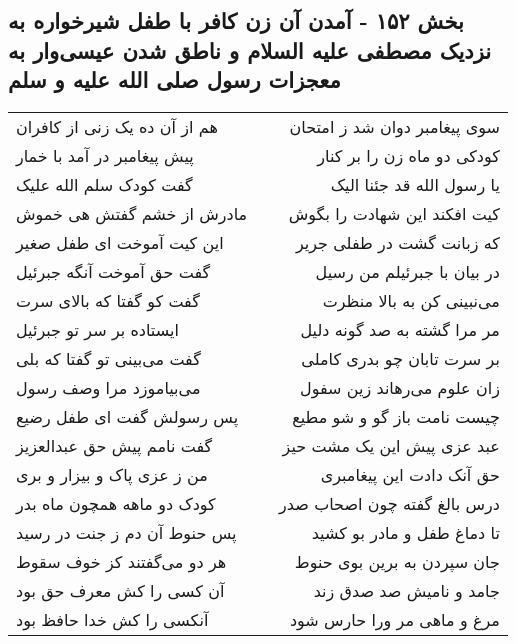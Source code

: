 \begin{center}
\section*{بخش ۱۵۲ - آمدن آن زن کافر با طفل شیرخواره به نزدیک مصطفی علیه السلام و ناطق شدن عیسی‌وار به معجزات رسول صلی الله علیه و سلم}
\label{sec:sh152}
\begin{longtable}{l p{0.5cm} r}
هم از آن ده یک زنی از کافران
&&
سوی پیغامبر دوان شد ز امتحان
\\
پیش پیغامبر در آمد با خمار
&&
کودکی دو ماه زن را بر کنار
\\
گفت کودک سلم الله علیک
&&
یا رسول الله قد جئنا الیک
\\
مادرش از خشم گفتش هی خموش
&&
کیت افکند این شهادت را بگوش
\\
این کیت آموخت ای طفل صغیر
&&
که زبانت گشت در طفلی جریر
\\
گفت حق آموخت آنگه جبرئیل
&&
در بیان با جبرئیلم من رسیل
\\
گفت کو گفتا که بالای سرت
&&
می‌نبینی کن به بالا منظرت
\\
ایستاده بر سر تو جبرئیل
&&
مر مرا گشته به صد گونه دلیل
\\
گفت می‌بینی تو گفتا که بلی
&&
بر سرت تابان چو بدری کاملی
\\
می‌بیاموزد مرا وصف رسول
&&
زان علوم می‌رهاند زین سفول
\\
پس رسولش گفت ای طفل رضیع
&&
چیست نامت باز گو و شو مطیع
\\
گفت نامم پیش حق عبدالعزیز
&&
عبد عزی پیش این یک مشت حیز
\\
من ز عزی پاک و بیزار و بری
&&
حق آنک دادت این پیغامبری
\\
کودک دو ماهه همچون ماه بدر
&&
درس بالغ گفته چون اصحاب صدر
\\
پس حنوط آن دم ز جنت در رسید
&&
تا دماغ طفل و مادر بو کشید
\\
هر دو می‌گفتند کز خوف سقوط
&&
جان سپردن به برین بوی حنوط
\\
آن کسی را کش معرف حق بود
&&
جامد و نامیش صد صدق زند
\\
آنکسی را کش خدا حافظ بود
&&
مرغ و ماهی مر ورا حارس شود
\\
\end{longtable}
\end{center}
